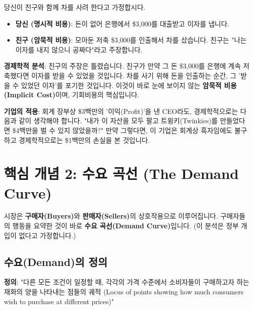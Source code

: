 \documentclass[11pt,a4paper]{book}
\theoremstyle{definition}
\begin{document}
\begin{keypointbox}[title={핵심 예시: 명시적 비용 vs. 암묵적 비용(기회비용)}]
    당신이 친구와 함께 차를 사려 한다고 가정합시다.

    \begin{itemize}
        \item \textbf{당신 (명시적 비용)}: 돈이 없어 은행에서 \$3,000를 대출받고 이자를 냅니다.
        \item \textbf{친구 (암묵적 비용)}: 모아둔 저축 \$3,000를 인출해서 차를 샀습니다. 친구는 "나는 이자를 내지 않으니 공짜다"라고 주장합니다.
    \end{itemize}

    \textbf{경제학적 분석}: 친구의 주장은 틀렸습니다.
    친구가 만약 그 돈 \$3,000를 은행에 계속 저축했다면 이자를 받을 수 있었을 것입니다.
    차를 사기 위해 돈을 인출하는 순간, 그 '받을 수 있었던 이자'를 포기한 것입니다.
    이것이 바로 눈에 보이지 않는 \textbf{암묵적 비용(Implicit Cost)}이며, 기회비용의 핵심입니다.

    \textbf{기업의 적용}: 회계 장부상 \$3백만의 '이익(Profit)'을 낸 CEO라도, 경제학적으로는 다음과 같이 생각해야 합니다. "내가 이 자산을 모두 팔고 트윙키(Twinkies)를 만들었다면 \$4백만을 벌 수 있지 않았을까?" 만약 그렇다면, 이 기업은 회계상 흑자임에도 불구하고 경제학적으로는 \$1백만의 손실을 본 것입니다.
\end{keypointbox}


\section{핵심 개념 2: 수요 곡선 (The Demand Curve)}

시장은 \textbf{구매자(Buyers)}와 \textbf{판매자(Sellers)}의 상호작용으로 이루어집니다.
구매자들의 행동을 요약한 것이 바로 \textbf{수요 곡선(Demand Curve)}입니다. (이 분석은 정부 개입이 없다고 가정합니다.)

\subsection{수요(Demand)의 정의}

\textbf{정의}: "다른 모든 조건이 일정할 때, 각각의 가격 수준에서 소비자들이 구매하고자 하는 재화의 양을 나타내는 점들의 궤적 (Locus of points showing how much consumers wish to purchase at different prices)"
\end{document}
